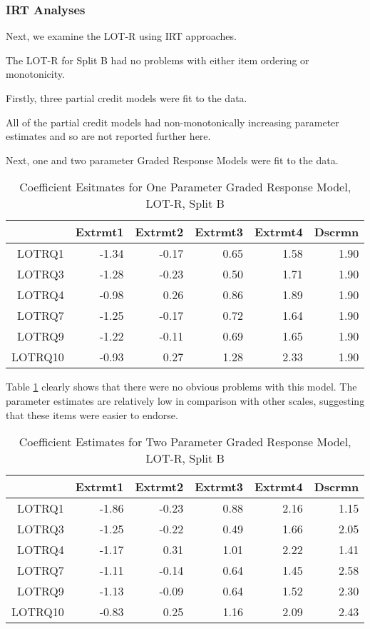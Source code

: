 \documentclass{article}
\begin{document}
\subsubsection{IRT Analyses}
\label{sec:irt-analyses-1}

Next, we examine the LOT-R using IRT approaches. 


The LOT-R for Split B had no problems with either item ordering or monotonicity. 

Firstly, three partial credit models were fit to the data. 


All of the partial credit models had non-monotonically increasing parameter estimates and so are not reported further here. 

Next, one and two parameter Graded Response Models were fit to the data. 



\begin{table}[ht]
\centering
\begin{tabular}{rrrrrr}
  \hline
 & Extrmt1 & Extrmt2 & Extrmt3 & Extrmt4 & Dscrmn \\ 
  \hline
LOTRQ1 & -1.34 & -0.17 & 0.65 & 1.58 & 1.90 \\ 
  LOTRQ3 & -1.28 & -0.23 & 0.50 & 1.71 & 1.90 \\ 
  LOTRQ4 & -0.98 & 0.26 & 0.86 & 1.89 & 1.90 \\ 
  LOTRQ7 & -1.25 & -0.17 & 0.72 & 1.64 & 1.90 \\ 
  LOTRQ9 & -1.22 & -0.11 & 0.69 & 1.65 & 1.90 \\ 
  LOTRQ10 & -0.93 & 0.27 & 1.28 & 2.33 & 1.90 \\ 
   \hline
\end{tabular}
\caption{Coefficient Esitmates for One Parameter Graded Response Model, LOT-R, Split B} 
\label{tab:lotr2bgrm1pl}
\end{table}
Table \ref{tab:lotr2bgrm1pl} clearly shows that there were no obvious problems with this model. The parameter estimates are relatively low in comparison with other scales, suggesting that these items were easier to endorse. 

\begin{table}[ht]
\centering
\begin{tabular}{rrrrrr}
  \hline
 & Extrmt1 & Extrmt2 & Extrmt3 & Extrmt4 & Dscrmn \\ 
  \hline
LOTRQ1 & -1.86 & -0.23 & 0.88 & 2.16 & 1.15 \\ 
  LOTRQ3 & -1.25 & -0.22 & 0.49 & 1.66 & 2.05 \\ 
  LOTRQ4 & -1.17 & 0.31 & 1.01 & 2.22 & 1.41 \\ 
  LOTRQ7 & -1.11 & -0.14 & 0.64 & 1.45 & 2.58 \\ 
  LOTRQ9 & -1.13 & -0.09 & 0.64 & 1.52 & 2.30 \\ 
  LOTRQ10 & -0.83 & 0.25 & 1.16 & 2.09 & 2.43 \\ 
   \hline
\end{tabular}
\caption{Coefficient Estimates for Two Parameter Graded Response Model, LOT-R, Split B} 
\label{tab:lotr2bgrm2pl}
\end{table}
\end{document}
